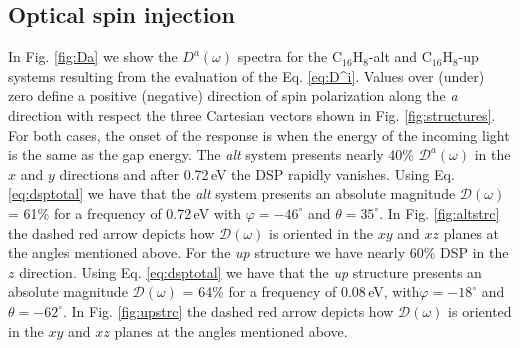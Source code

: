 \documentclass[pss]{wiley2sp} %
\begin{document}
\subsection{Optical spin injection}\label{subsec:results-DSP}

In Fig. \ref{fig:Da} we show the $D^{a}(\omega)$ spectra for the
C$_{16}$H$_{8}$-alt and C$_{16}$H$_{8}$-up systems resulting from the
evaluation of the Eq. \eqref{eq:D^i}. Values over (under) zero define a
positive (negative) direction of spin polarization along the \emph{a}
direction with respect the three Cartesian vectors shown in Fig.
\ref{fig:structures}. For both cases, the onset of the response is when the
energy of the incoming light is the same as the gap energy. The \emph{alt}
system presents nearly 40\% $\mathcal{D}^{a}(\omega)$ in the $x$ and $y$
directions and after 0.72\,eV the DSP rapidly vanishes. Using Eq.
\eqref{eq:dsptotal} we have that the \emph{alt} system presents an absolute
magnitude $\mathcal{D}(\omega)$ = 61\% for a frequency of 0.72\,eV with
$\varphi = -46^{\circ}$ and $\theta=35^{\circ}$. In Fig. \ref{fig:altstrc} the
dashed red arrow depicts how $\mathcal{D}(\omega)$ is oriented in the $xy$ and
$xz$ planes at the angles mentioned above. For the
\emph{up} structure we have nearly 60\% DSP in the $z$ direction. Using Eq.
\eqref{eq:dsptotal} we have that the \emph{up} structure presents an absolute
magnitude $\mathcal{D}(\omega)$ = 64\% for a frequency of 0.08\,eV,
with$\varphi = -18^{\circ}$ and $\theta = -62^{\circ}$. In Fig.
\ref{fig:upstrc} the dashed red arrow depicts how $\mathcal{D}(\omega)$ is
oriented in the $xy$ and $xz$ planes at the angles mentioned above.
\end{document}
